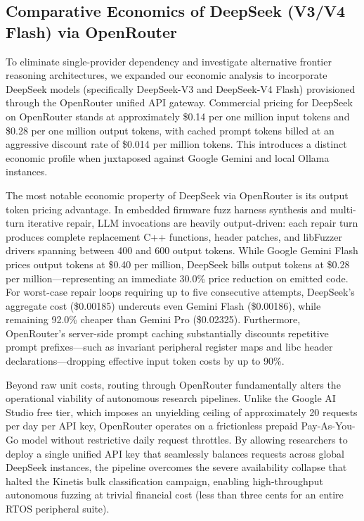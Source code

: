 \documentclass[11pt,a4paper]{article}
\begin{document}
\subsection{Comparative Economics of DeepSeek (V3/V4 Flash) via OpenRouter}

To eliminate single-provider dependency and investigate alternative frontier reasoning architectures, we expanded our economic analysis to incorporate DeepSeek models (specifically DeepSeek-V3 and DeepSeek-V4 Flash) provisioned through the OpenRouter unified API gateway. Commercial pricing for DeepSeek on OpenRouter stands at approximately \$0.14 per one million input tokens and \$0.28 per one million output tokens, with cached prompt tokens billed at an aggressive discount rate of \$0.014 per million tokens. This introduces a distinct economic profile when juxtaposed against Google Gemini and local Ollama instances.

The most notable economic property of DeepSeek via OpenRouter is its output token pricing advantage. In embedded firmware fuzz harness synthesis and multi-turn iterative repair, LLM invocations are heavily output-driven: each repair turn produces complete replacement C++ functions, header patches, and libFuzzer drivers spanning between 400 and 600 output tokens. While Google Gemini Flash prices output tokens at \$0.40 per million, DeepSeek bills output tokens at \$0.28 per million---representing an immediate 30.0\% price reduction on emitted code. For worst-case repair loops requiring up to five consecutive attempts, DeepSeek's aggregate cost (\$0.00185) undercuts even Gemini Flash (\$0.00186), while remaining 92.0\% cheaper than Gemini Pro (\$0.02325). Furthermore, OpenRouter's server-side prompt caching substantially discounts repetitive prompt prefixes---such as invariant peripheral register maps and libc header declarations---dropping effective input token costs by up to 90\%.

Beyond raw unit costs, routing through OpenRouter fundamentally alters the operational viability of autonomous research pipelines. Unlike the Google AI Studio free tier, which imposes an unyielding ceiling of approximately 20 requests per day per API key, OpenRouter operates on a frictionless prepaid Pay-As-You-Go model without restrictive daily request throttles. By allowing researchers to deploy a single unified API key that seamlessly balances requests across global DeepSeek instances, the pipeline overcomes the severe availability collapse that halted the Kinetis bulk classification campaign, enabling high-throughput autonomous fuzzing at trivial financial cost (less than three cents for an entire RTOS peripheral suite).
\end{document}
